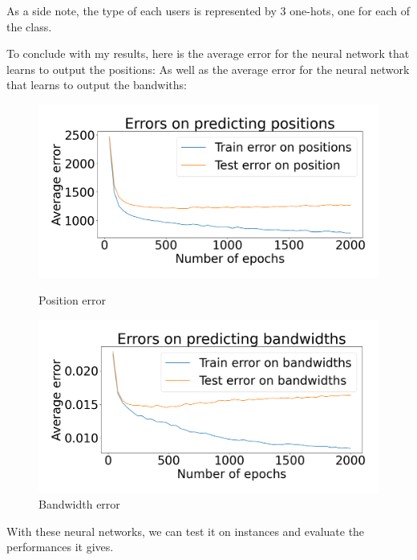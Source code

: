 \documentclass[letterpaper]{article}
\begin{document}
As a side note, the type of each users is represented by 3 one-hots, one for each of the class.

To conclude with my results, here is the average error for the neural network that learns to output the positions:
As well as the average error for the neural network that learns to output the bandwiths:

\begin{figure}[H]
    \centering
    \begin{minipage}[b]{0.45\textwidth}
        \centering
        \includegraphics[width=\textwidth]{images/mix_pos.png}
        \caption{Position error}
        \label{fig:image5}
    \end{minipage}
    \hspace{0.05\textwidth}
    \begin{minipage}[b]{0.45\textwidth}
        \centering
        \includegraphics[width=\textwidth]{images/bw_error_epochs.png}
        \caption{Bandwidth error}
        \label{fig:image6}
    \end{minipage}
\end{figure}

\;

With these neural networks, we can test it on instances and evaluate the performances it gives.
\end{document}
